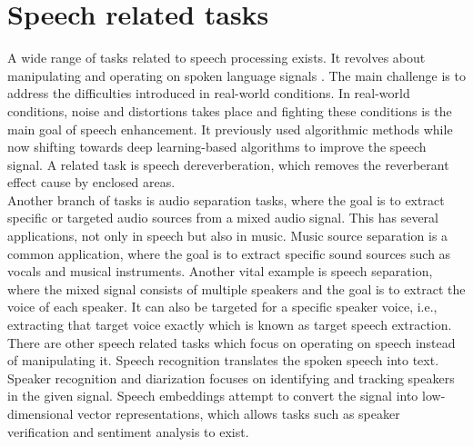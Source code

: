 \section{Speech related tasks}
A wide range of tasks related to speech processing exists. It revolves about manipulating and operating on spoken language signals \cite{mehrish2023}. The main challenge is to address the difficulties introduced in real-world conditions. In real-world conditions, noise and distortions takes place and fighting these conditions is the main goal of speech enhancement. It previously used algorithmic methods while now shifting towards deep learning-based algorithms to improve the speech signal. A related task is speech dereverberation, which removes the reverberant effect cause by enclosed areas.\\
Another branch of tasks is audio separation tasks, where the goal is to extract specific or targeted audio sources from a mixed audio signal. This has several applications, not only in speech but also in music. Music source separation is a common application, where the goal is to extract specific sound sources such as vocals and musical instruments. Another vital example is speech separation, where the mixed signal consists of multiple speakers and the goal is to extract the voice of each speaker. It can also be targeted for a specific speaker voice, i.e., extracting that target voice exactly which is known as target speech extraction.\\
There are other speech related tasks which focus on operating on speech instead of manipulating it. Speech recognition translates the spoken speech into text. Speaker recognition and diarization focuses on identifying and tracking speakers in the given signal. Speech embeddings attempt to convert the signal into low-dimensional vector representations, which allows tasks such as speaker verification and sentiment analysis to exist.

